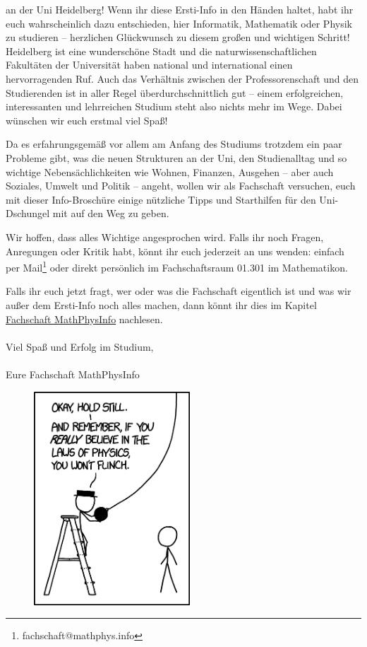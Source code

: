 
an der Uni Heidelberg! Wenn ihr diese Ersti-Info in den Händen haltet, habt ihr euch wahrscheinlich dazu entschieden, hier Informatik, Mathematik oder Physik zu studieren -- herzlichen Glückwunsch zu diesem großen und wichtigen Schritt! Heidelberg ist eine wunderschöne Stadt und die naturwissenschaftlichen Fakultäten der Universität haben national und international einen hervorragenden Ruf. Auch das Verhältnis zwischen der Professorenschaft und den Studierenden ist in aller Regel überdurchschnittlich gut -- einem erfolgreichen, interessanten und lehrreichen Studium steht also nichts mehr im Wege. Dabei wünschen wir euch erstmal viel Spaß! \smiley

Da es erfahrungsgemäß vor allem am Anfang des Studiums trotzdem ein paar Probleme gibt, was die neuen Strukturen an der Uni, den Studienalltag und so wichtige Nebensächlichkeiten wie Wohnen, Finanzen, Ausgehen -- aber auch Soziales, Umwelt und Politik -- angeht, wollen wir als Fachschaft versuchen, euch mit dieser Info-Broschüre einige nützliche Tipps und Starthilfen für den Uni-Dschungel mit auf den Weg zu geben.

\vfill
\eject

Wir hoffen, dass alles Wichtige angesprochen wird. Falls ihr noch Fragen, Anregungen oder Kritik habt, könnt ihr euch jederzeit an uns wenden: einfach per Mail\footnote{fachschaft@mathphys.info} oder direkt persönlich im Fachschaftsraum 01.301 im Mathematikon.

Falls ihr euch jetzt fragt, wer oder was die Fachschaft eigentlich ist und was wir außer dem Ersti-Info noch alles machen, dann könnt ihr dies im Kapitel \hyperref[diefsmathphys]{Fachschaft MathPhysInfo} nachlesen. \\\\

\noindent Viel Spaß und Erfolg im Studium,\\\\

Eure Fachschaft MathPhysInfo


\begin{figure}[b]
\centering
\includegraphics[height=8cm]{bilder/laws_of_physics_2x.png}
\end{figure}
